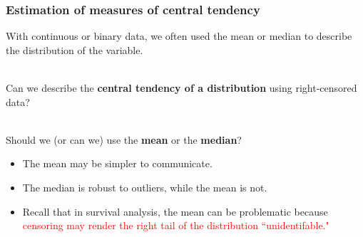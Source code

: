 \documentclass[10pt,t]{beamer}
\begin{document}
\begin{frame}
\frametitle{Estimation of measures of central tendency}

With continuous or binary data, we often used the mean or median to describe the distribution of the variable.
\\ ~\ 

Can we describe the \textbf{central tendency of a distribution} using right-censored data?
\\ ~\ 

Should we (or can we) use the \textbf{mean} or the \textbf{median}?
\begin{itemize}
	
	\medskip
	
\item The mean may be simpler to communicate.

\medskip

\item The median is robust to outliers, while the mean is not.

\medskip

\item Recall that in survival analysis, the mean can be problematic because \textcolor{red}{censoring may render the right tail of the distribution ``unidentifable."}
\end{itemize}
\end{frame}

%
%
%
%
\end{document}
